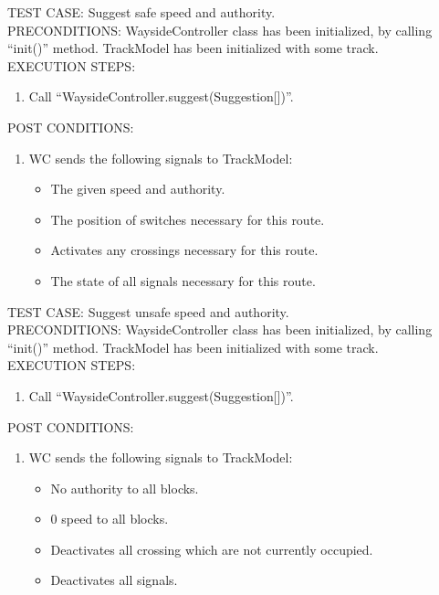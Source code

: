 \documentclass{scrreprt}
\begin{document}
        TEST CASE: Suggest safe speed and authority.\\
        PRECONDITIONS: WaysideController class has been initialized, by calling ``init()'' method.
        TrackModel has been initialized with some track.\\
        EXECUTION STEPS: \begin{enumerate}
            \item Call ``WaysideController.suggest(Suggestion[])''.
        \end{enumerate}
        POST CONDITIONS: \begin{enumerate}
            \item WC sends the following signals to TrackModel:
            \begin{itemize}
                \item The given speed and authority.
                \item The position of switches necessary for this route.
                \item Activates any crossings necessary for this route.
                \item The state of all signals necessary for this route.
            \end{itemize}
        \end{enumerate}

        TEST CASE: Suggest unsafe speed and authority.\\
        PRECONDITIONS: WaysideController class has been initialized, by calling ``init()'' method.
        TrackModel has been initialized with some track.\\
        EXECUTION STEPS: \begin{enumerate}
            \item Call ``WaysideController.suggest(Suggestion[])''.
        \end{enumerate}
        POST CONDITIONS: \begin{enumerate}
            \item WC sends the following signals to TrackModel:
            \begin{itemize}
                \item No authority to all blocks.
                \item 0 speed to all blocks.
                \item Deactivates all crossing which are not currently occupied.
                \item Deactivates all signals.
            \end{itemize}
        \end{enumerate}
\end{document}
